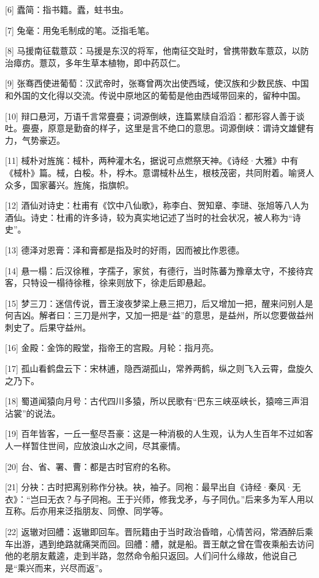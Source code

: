 \documentclass[12pt,UTF8]{ctexbook}
\begin{document}
[6] 蠹简：指书籍。蠹，蛀书虫。

[7] 兔毫：用兔毛制成的笔。泛指毛笔。

[8] 马援南征载薏苡：马援是东汉的将军，他南征交趾时，曾携带数车薏苡，以防治瘴疠。薏苡，多年生草本植物，即中药苡仁。

[9] 张骞西使进葡萄：汉武帝时，张骞曾两次出使西域，使汉族和少数民族、中国和外国的文化得以交流。传说中原地区的葡萄是他由西域带回来的，留种中国。

[10] 辩口悬河，万语千言常亹亹；词源倒峡，连篇累牍自滔滔：都形容人善于谈吐。亹亹，原意是勤奋的样子，这里是言不绝口的意思。词源倒峡：谓诗文雄健有力，气势豪迈。

[11] 棫朴对旌旄：棫朴，两种灌木名，据说可点燃祭天神。《诗经·大雅》中有《棫朴》篇。棫，白桵。朴，桴木。意谓棫朴丛生，根枝茂密，共同附着。喻贤人众多，国家蕃兴。旌旄，指旗帜。

[12] 酒仙对诗史：杜甫有《饮中八仙歌》，称李白、贺知章、李琎、张旭等八人为酒仙。诗史：杜甫的许多诗，较为真实地记述了当时的社会状况，被人称为“诗史”。

[13] 德泽对恩膏：泽和膏都是指及时的好雨，因而被比作恩德。

[14] 悬一榻：后汉徐稚，字孺子，家贫，有德行，当时陈蕃为豫章太守，不接待宾客，只特设一榻待徐稚，徐来则放下，徐走后即悬起。

[15] 梦三刀：迷信传说，晋王浚夜梦梁上悬三把刀，后又增加一把，醒来问别人是何吉凶。解者曰：三刀是州字，又加一把是“益”的意思，是益州，所以您要做益州刺史了。后果守益州。

[16] 金殿：金饰的殿堂，指帝王的宫殿。月轮：指月亮。

[17] 孤山看鹤盘云下：宋林逋，隐西湖孤山，常养两鹤，纵之则飞入云霄，盘旋久之乃下。

[18] 蜀道闻猿向月号：古代四川多猿，所以民歌有“巴东三峡巫峡长，猿啼三声泪沾裳”的说法。

[19] 百年皆客，一丘一壑尽吾豪：这是一种消极的人生观，认为人生百年不过如客人一样暂住世间，应放浪山水之间，尽其豪情。

[20] 台、省、署、曹：都是古时官府的名称。

[21] 分袂：古时把离别称作分袂。袂，袖子。同袍：最早出自《诗经·秦风·无衣》：“岂曰无衣？与子同袍。王于兴师，修我戈矛，与子同仇。”后来多为军人用以互称。后亦用来泛指朋友、同僚、同学等。

[22] 返辙对回艚：返辙即回车。晋阮籍由于当时政治昏暗，心情苦闷，常酒醉后乘车出游，遇到绝路就痛哭而回。回艚：艚，就是船。晋王献之曾在雪夜乘船去访问他的老朋友戴逵，走到半路，忽然命令船只返回。人们问什么缘故，他说自己是“乘兴而来，兴尽而返”。
\end{document}
